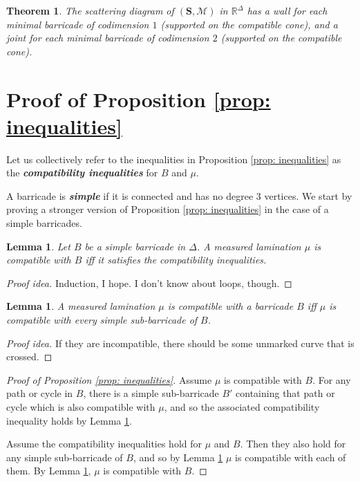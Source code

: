 \documentclass{amsart}
\newtheorem{lemma}[proposition]{Lemma}
\newtheorem{thm}[proposition]{Theorem}
\theoremstyle{definition}
\theoremstyle{remark}
\numberwithin{equation}{section}
\newcommand{\newword}[1]{\textbf{\emph{#1}}}
\newcommand{\0}{{\mathbf{0}}}
\newcommand{\M}{\mathcal{M}}
\renewcommand{\S}{\mathbf{S}}
\begin{document}
\begin{thm}
The scattering diagram of $(\S,\M)$ in $\mathbb{R}^\Delta$ has a wall for each minimal barricade of codimension $1$ (supported on the compatible cone), and a joint for each minimal barricade of codimension $2$ (supported on the compatible cone).
\end{thm}


\section{Proof of Proposition \ref{prop: inequalities}}

Let us collectively refer to the inequalities in Proposition \ref{prop: inequalities} as the \newword{compatibility inequalities} for $B$ and $\mu$. 

A barricade is \newword{simple} if it is connected and has no degree $3$ vertices. We start by proving a stronger version of Proposition \ref{prop: inequalities} in the case of a simple barricades.

\begin{lemma}\label{lemma: simplebarricade}
Let $B$ be a simple barricade in $\Delta$. A measured lamination $\mu$ is compatible with $B$ iff it satisfies the compatibility inequalities.
\end{lemma}

\begin{proof}[Proof idea]
Induction, I hope. I don't know about loops, though.
\end{proof}
	
\begin{lemma}\label{lemma: simplesub}
A measured lamination $\mu$ is compatible with a barricade $B$ iff $\mu$ is compatible with every simple sub-barricade of $B$.
\end{lemma}

\begin{proof}[Proof idea]
If they are incompatible, there should be some unmarked curve that is crossed.
\end{proof}

\begin{proof}[Proof of Proposition \ref{prop: inequalities}]
Assume $\mu$ is compatible with $B$. For any path or cycle in $B$, there is a simple sub-barricade $B'$ containing that path or cycle which is also compatible with $\mu$, and so the associated compatibility inequality holds by Lemma \ref{lemma: simplebarricade}.

Assume the compatibility inequalities hold for $\mu$ and $B$. Then they also hold for any simple sub-barricade of $B$, and so by Lemma \ref{lemma: simplebarricade} $\mu$ is compatible with each of them. By Lemma \ref{lemma: simplesub}, $\mu$ is compatible with $B$.
\end{proof}
\end{document}

